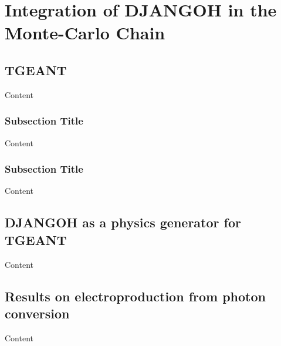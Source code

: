 
\chapter{Integration of DJANGOH in the Monte-Carlo Chain} %

\label{ch:MC} %


\section{TGEANT}

Content


\subsection{Subsection Title}

Content


\subsection{Subsection Title}

Content


\section{DJANGOH as a physics generator for TGEANT}

Content


\section{Results on electroproduction from photon conversion}

Content
